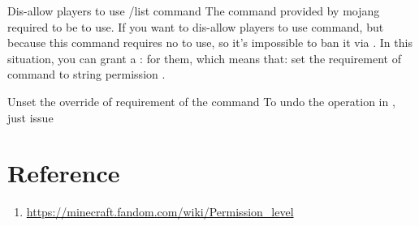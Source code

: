 \begin{example}{Dis-allow players to use /list command}
    The command  provided by mojang required  to be  to use.
    If you want to dis-allow players to use  command, but because this command requires no  to use, so it's impossible to ban it via .
    In this situation, you can grant a :  for them, which means that: set the requirement of command  to string permission .
\end{example}

\begin {example}{Unset the override of requirement of the command}
    To undo the operation in , just issue 
\end{example}


\section{Reference}
\begin{enumerate}
    \item \url{https://minecraft.fandom.com/wiki/Permission\_level}
\end{enumerate}
